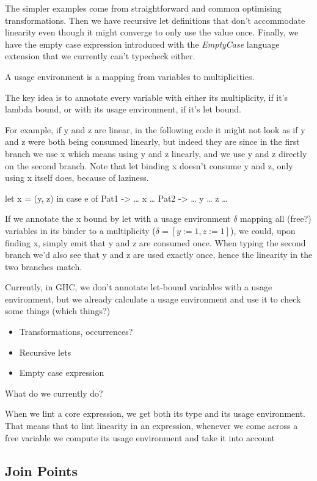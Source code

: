 \documentclass[a4paper, draft]{article}
\begin{document}
The simpler examples come from straightforward and common optimising
transformations. Then we have recursive let definitions that don't accommodate
linearity even though it might converge to only use the value once. Finally, we
have the empty case expression introduced with the \emph{EmptyCase} language
extension that we currently can't typecheck either.


A usage environment is a mapping from variables to multiplicities.

The key idea is to annotate every variable with either its multiplicity, if it's
lambda bound, or with its usage environment, if it's let bound.

For example, if y and z are linear, in the following code it might not look as
if y and z were both being consumed linearly, but indeed they are since in the
first branch we use x which means using y and z linearly, and we use y and z
directly on the second branch. Note that let binding x doesn't consume y and z,
only using x itself does, because of laziness.
\begin{code}
let x = (y, z) in
case e of
  Pat1 -> … x …
  Pat2 -> … y … z …
\end{code}

If we annotate the x bound by let with a usage environment $\delta$ mapping all (free?)
variables in its binder to a multiplicity ($\delta = [y := 1, z := 1]$), we
could, upon finding x, simply emit that y and z are consumed once. When typing
the second branch we'd also see that y and z are used exactly once, hence the
linearity in the two branches match.

Currently, in GHC, we don't annotate let-bound variables with a usage
environment, but we already calculate a usage environment and use it to check
some things (which things?)

\begin{itemize}
    \item Transformations, occurrences?
    \item Recursive lets
    \item Empty case expression
\end{itemize}

What do we currently do?

When we lint a core expression, we get both its type and its usage environment.
That means that to lint linearity in an expression, whenever we come across a
free variable we compute its usage environment and take it into account

\subsection{Join Points}
\end{document}
